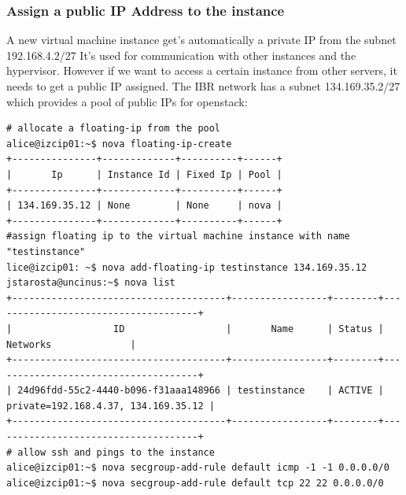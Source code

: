 \documentclass[a4paper,ngerman,bibtotocliststotoc]{scrartcl}
\begin{document}
\subsubsection{Assign a public IP Address to the instance}
A new virtual machine instance get's automatically a private IP from
the subnet 192.168.4.2/27 It's used for communication with other
instances and the hypervisor. However if we want to access a certain
instance from other servers, it needs to get a public IP assigned. 
The IBR network has a subnet 134.169.35.2/27 which provides a pool of
public IPs for openstack:
\begin{verbatim}
# allocate a floating-ip from the pool
alice@izcip01:~$ nova floating-ip-create
+---------------+-------------+----------+------+
|       Ip      | Instance Id | Fixed Ip | Pool |
+---------------+-------------+----------+------+
| 134.169.35.12 | None        | None     | nova |
+---------------+-------------+----------+------+
#assign floating ip to the virtual machine instance with name "testinstance"
lice@izcip01: ~$ nova add-floating-ip testinstance 134.169.35.12
jstarosta@uncinus:~$ nova list
+--------------------------------------+-----------------+--------+-------------------------------------+
|                  ID                  |       Name      | Status |               Networks              |
+--------------------------------------+-----------------+--------+-------------------------------------+
| 24d96fdd-55c2-4440-b096-f31aaa148966 | testinstance    | ACTIVE | private=192.168.4.37, 134.169.35.12 |
+--------------------------------------+-----------------+--------+-------------------------------------+
# allow ssh and pings to the instance
alice@izcip01:~$ nova secgroup-add-rule default icmp -1 -1 0.0.0.0/0
alice@izcip01:~$ nova secgroup-add-rule default tcp 22 22 0.0.0.0/0

\end{verbatim}
\end{document}
